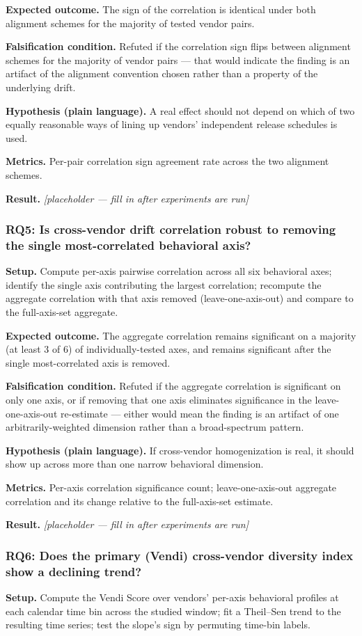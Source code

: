 \documentclass[11pt]{article}
\newcommand{\ph}{\textit{[placeholder --- fill in after experiments are run]}}
\begin{document}
\textbf{Expected outcome.} The sign of the correlation is identical under both alignment schemes for the majority of tested vendor pairs.

\textbf{Falsification condition.} Refuted if the correlation sign flips between alignment schemes for the majority of vendor pairs --- that would indicate the finding is an artifact of the alignment convention chosen rather than a property of the underlying drift.

\textbf{Hypothesis (plain language).} A real effect should not depend on which of two equally reasonable ways of lining up vendors' independent release schedules is used.

\textbf{Metrics.} Per-pair correlation sign agreement rate across the two alignment schemes.

\textbf{Result.} \ph

\subsubsection{RQ5: Is cross-vendor drift correlation robust to removing the single most-correlated behavioral axis?}
\textbf{Setup.} Compute per-axis pairwise correlation across all six behavioral axes; identify the single axis contributing the largest correlation; recompute the aggregate correlation with that axis removed (leave-one-axis-out) and compare to the full-axis-set aggregate.

\textbf{Expected outcome.} The aggregate correlation remains significant on a majority (at least 3 of 6) of individually-tested axes, and remains significant after the single most-correlated axis is removed.

\textbf{Falsification condition.} Refuted if the aggregate correlation is significant on only one axis, or if removing that one axis eliminates significance in the leave-one-axis-out re-estimate --- either would mean the finding is an artifact of one arbitrarily-weighted dimension rather than a broad-spectrum pattern.

\textbf{Hypothesis (plain language).} If cross-vendor homogenization is real, it should show up across more than one narrow behavioral dimension.

\textbf{Metrics.} Per-axis correlation significance count; leave-one-axis-out aggregate correlation and its change relative to the full-axis-set estimate.

\textbf{Result.} \ph

\subsubsection{RQ6: Does the primary (Vendi) cross-vendor diversity index show a declining trend?}
\textbf{Setup.} Compute the Vendi Score over vendors' per-axis behavioral profiles at each calendar time bin across the studied window; fit a Theil--Sen trend to the resulting time series; test the slope's sign by permuting time-bin labels.
\end{document}
